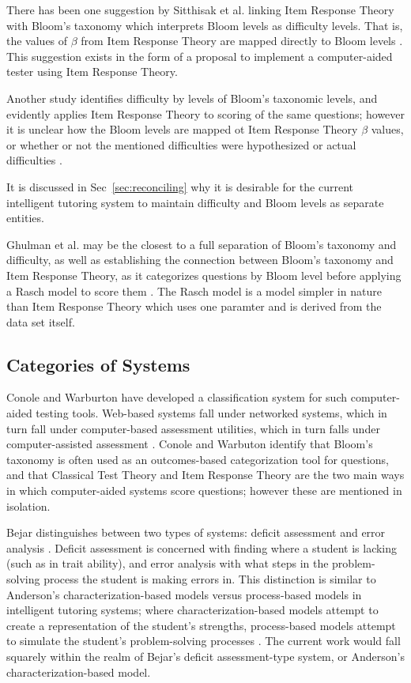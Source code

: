 There has been one suggestion by Sitthisak et al.  linking Item Response Theory
with Bloom's taxonomy which interprets Bloom levels as difficulty levels.  That
is, the values of $\beta$ from Item Response Theory are mapped directly to
Bloom levels \cite{sitthisak}.  This suggestion exists in the form of a
proposal to implement a computer-aided tester using Item Response Theory.

Another study identifies difficulty by levels of Bloom's taxonomic levels, and
evidently applies Item Response Theory to scoring of the same questions;
however it is unclear how the Bloom levels are mapped ot Item Response Theory
$\beta$ values, or whether or not the mentioned difficulties were hypothesized
or actual difficulties \cite{osborne2013grounded}.  

It is discussed in Sec~\ref{sec:reconciling} why it is desirable for the
current intelligent tutoring system to maintain difficulty and Bloom levels as
separate entities.

Ghulman et al. may be the closest to a full separation of Bloom's taxonomy and
difficulty, as well as establishing the connection between Bloom's taxonomy and
Item Response Theory, as it categorizes questions by Bloom level before
applying a Rasch model to score them \cite{ghulman2009modern}.  The Rasch model
is a model simpler in nature than Item Response Theory which uses one paramter
and is derived from the data set itself.

\subsection{Categories of Systems}

Conole and Warburton have developed a classification system for such
computer-aided testing tools.  Web-based systems \cite{wang2004web} fall under
networked systems, which in turn fall under computer-based assessment
utilities, which in turn falls under computer-assisted assessment
\cite{conole2005review}.  Conole and Warbuton identify that Bloom's taxonomy is
often used as an outcomes-based categorization tool for questions, and that
Classical Test Theory and Item Response Theory are the two main ways in which
computer-aided systems score questions; however these are mentioned in
isolation.

Bejar distinguishes between two types of systems: deficit assessment and error
analysis \cite{bejar1984educational}.  Deficit assessment is concerned with
finding where a student is lacking (such as in trait ability), and error
analysis with what steps in the problem-solving process the student is making
errors in.  This distinction is similar to Anderson's characterization-based
models versus process-based models in intelligent tutoring systems; where
characterization-based models attempt to create a representation of the
student's strengths, process-based models attempt to simulate the student's
problem-solving processes \cite{anderson}.  The current work would fall
squarely within the realm of Bejar's deficit assessment-type system, or
Anderson's characterization-based model.

